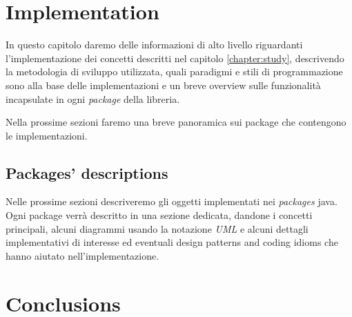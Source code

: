 \documentclass[8pt, a4paper]{report}
\begin{document}


% 


\chapter{Implementation}
\label{chapter:implementation}
In questo capitolo daremo delle informazioni di alto livello
riguardanti l'implementazione dei concetti descritti nel capitolo
\ref{chapter:study}, descrivendo la metodologia di sviluppo
utilizzata, quali paradigmi e stili di programmazione sono alla base
delle implementazioni e un breve overview sulle funzionalit\`a
incapsulate in ogni \emph{package} della libreria.





Nella prossime sezioni faremo una breve panoramica sui package che
contengono le implementazioni.

\section{Packages' descriptions}
\label{section:packages-descriptions}

Nelle prossime sezioni descriveremo gli oggetti implementati nei
\emph{packages} java. Ogni package verr\`a descritto in una sezione
dedicata, dandone i concetti principali, alcuni diagrammi usando la
notazione \emph{UML} e alcuni dettagli implementativi di interesse ed
eventuali design patterns and coding idioms che hanno aiutato
nell'implementazione.







% 

\chapter{Conclusions}
\label{chapter:conclusions}





% 
% 
\end{document}
